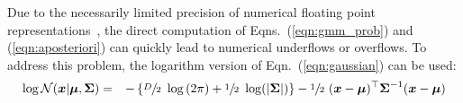 Due to the necessarily limited precision of numerical floating point representations~\cite{Goldberg_1991,Monniaux_2008},
the direct computation of Eqns.~(\ref{eqn:gmm_prob}) and (\ref{eqn:aposteriori}) can quickly lead to numerical underflows or overflows.
To address this problem, the logarithm version of Eqn.~(\ref{eqn:gaussian}) can be used:
%
\begin{eqnarray}
  \log {{\mathcal{N}}}( {\boldsymbol{x}} | {\boldsymbol{\mu}}, {\boldsymbol{\Sigma}} )
  & = &
  - \left\{
  \sfrac{D}{2} ~ \log \left( 2\pi \right)
  +
  \sfrac{1}{2} ~ \log ( |{\boldsymbol{\Sigma}}| )
  \right\}
  -
  \sfrac{1}{2} ~ ({\boldsymbol{x}}-{\boldsymbol{\mu}})^\top {\boldsymbol{\Sigma}}^{-1} ({\boldsymbol{x}}-{\boldsymbol{\mu}})
\end{eqnarray}


